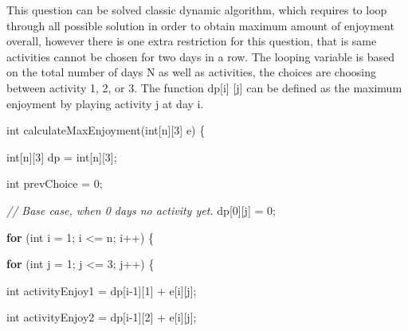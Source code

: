 \documentclass[
]{article}
\author{}
\date{}
\newenvironment{Shaded}{}{}
\newcommand{\CommentTok}[1]{\textcolor[rgb]{0.38,0.63,0.69}{\textit{#1}}}
\newcommand{\ControlFlowTok}[1]{\textcolor[rgb]{0.00,0.44,0.13}{\textbf{#1}}}
\newcommand{\DataTypeTok}[1]{\textcolor[rgb]{0.56,0.13,0.00}{#1}}
\newcommand{\DecValTok}[1]{\textcolor[rgb]{0.25,0.63,0.44}{#1}}
\newcommand{\FunctionTok}[1]{\textcolor[rgb]{0.02,0.16,0.49}{#1}}
\newcommand{\NormalTok}[1]{#1}
\newcommand{\OperatorTok}[1]{\textcolor[rgb]{0.40,0.40,0.40}{#1}}
\begin{document}
This question can be solved classic dynamic algorithm, which requires to
loop through all possible solution in order to obtain maximum amount of
enjoyment overall, however there is one extra restriction for this
question, that is same activities cannot be chosen for two days in a
row. The looping variable is based on the total number of days N as well
as activities, the choices are choosing between activity 1, 2, or 3. The
function dp{[}i{]} {[}j{]} can be defined as the maximum enjoyment by
playing activity j at day i.

\begin{Shaded}
\begin{Highlighting}[]
\DataTypeTok{int} \FunctionTok{calculateMaxEnjoyment}\OperatorTok{(}\DataTypeTok{int}\OperatorTok{[}\NormalTok{n}\OperatorTok{][}\DecValTok{3}\OperatorTok{]}\NormalTok{ e}\OperatorTok{)} \OperatorTok{\{}

    \DataTypeTok{int}\OperatorTok{[}\NormalTok{n}\OperatorTok{][}\DecValTok{3}\OperatorTok{]}\NormalTok{ dp }\OperatorTok{=} \DataTypeTok{int}\OperatorTok{[}\NormalTok{n}\OperatorTok{][}\DecValTok{3}\OperatorTok{];}

    \DataTypeTok{int}\NormalTok{ prevChoice }\OperatorTok{=} \DecValTok{0}\OperatorTok{;}

    \CommentTok{// Base case, when 0 days no activity yet.
}
\NormalTok{    dp}\OperatorTok{[}\DecValTok{0}\OperatorTok{][}\NormalTok{j}\OperatorTok{]} \OperatorTok{=} \DecValTok{0}\OperatorTok{;}

    

    \ControlFlowTok{for} \OperatorTok{(}\DataTypeTok{int}\NormalTok{ i }\OperatorTok{=} \DecValTok{1}\OperatorTok{;}\NormalTok{ i }\OperatorTok{\textless{}=}\NormalTok{ n}\OperatorTok{;}\NormalTok{ i}\OperatorTok{++)} \OperatorTok{\{}

        \ControlFlowTok{for} \OperatorTok{(}\DataTypeTok{int}\NormalTok{ j }\OperatorTok{=} \DecValTok{1}\OperatorTok{;}\NormalTok{ j }\OperatorTok{\textless{}=} \DecValTok{3}\OperatorTok{;}\NormalTok{ j}\OperatorTok{++)} \OperatorTok{\{}

            \DataTypeTok{int}\NormalTok{ activityEnjoy1 }\OperatorTok{=}\NormalTok{ dp}\OperatorTok{[}\NormalTok{i}\OperatorTok{{-}}\DecValTok{1}\OperatorTok{][}\DecValTok{1}\OperatorTok{]} \OperatorTok{+}\NormalTok{ e}\OperatorTok{[}\NormalTok{i}\OperatorTok{][}\NormalTok{j}\OperatorTok{];}

            \DataTypeTok{int}\NormalTok{ activityEnjoy2 }\OperatorTok{=}\NormalTok{ dp}\OperatorTok{[}\NormalTok{i}\OperatorTok{{-}}\DecValTok{1}\OperatorTok{][}\DecValTok{2}\OperatorTok{]} \OperatorTok{+}\NormalTok{ e}\OperatorTok{[}\NormalTok{i}\OperatorTok{][}\NormalTok{j}\OperatorTok{];}


\end{Highlighting}
\end{Shaded}
\end{document}
